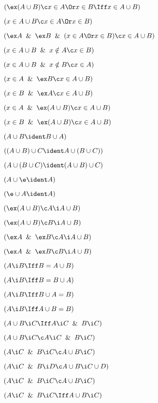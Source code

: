  $(\ex (A\cup B) \c x \in A \Or x \in B \Iff x \in A \cup B )$

 $( x \in A \cup B \c x \in A \Or x \in B)$

 $(\ex A \And \ex B \And (x \in A \Or x \in B) \c x \in A \cup B )$

 $(x \in A \cup B \And x \notin A \c x \in B)$

 $(x \in A \cup B \And x \notin B \c x \in A)$

 $(x \in A \And \ex B \c x \in A \cup B)$

 $(x \in B \And \ex A \c x \in A \cup B)$

 $(x \in A \And \ex (A \cup B) \c x \in A \cup B)$

 $(x \in B \And \ex (A \cup B) \c x \in A \cup B)$

 $(A \cup B \ident B\cup A)$

 $((A \cup B) \cup C \ident A \cup (B \cup C))$

 $(A \cup (B \cup C) \ident (A \cup B) \cup C)$

$(A \cup \e \ident A)$

$(\e \cup A  \ident A)$

 $(\ex (A \cup B) \c A \i A \cup B)$

 $(\ex (A \cup B) \c B \i A \cup B)$

 $(\ex A \And \ex B \c A \i A \cup B)$

 $(\ex A \And \ex B \c B \i A \cup B)$

 $(A\i B \Iff B = A\cup B )$

 $(A\i B \Iff B = B\cup A )$

 $(A\i B \Iff  B\cup A = B )$

 $(A\i B \Iff  A\cup B = B)$

 $(A \cup B \i C \Iff A \i C \And B \i C)$

 $(A \cup B \i C \c A \i C \And B \i C)$

 $(A \i C \And B \i C \c A \cup B\i C)$

 $(A \i C \And B \i D \c A \cup B \i C \cup D)$

 $(A \i C \And B \i C \c A \cup B\i C)$

 $(A \i C \And B \i C \Iff A \cup B\i C)$

